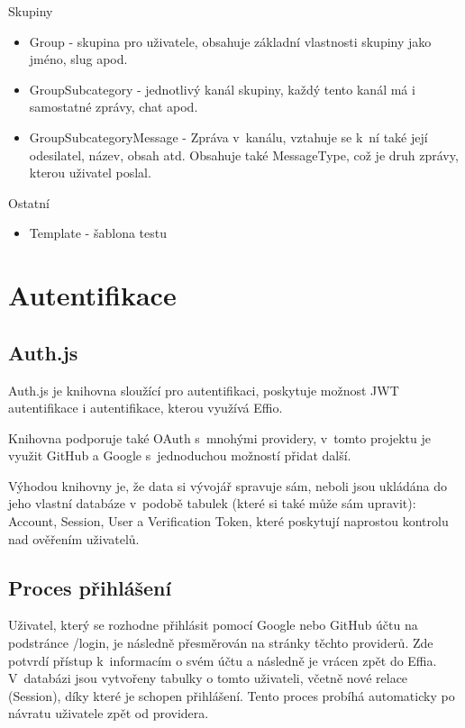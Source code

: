 \documentclass[12pt, a4paper,
openright
]{report}
\begin{document}
Skupiny
\begin{itemize}
	\item Group - skupina pro uživatele, obsahuje základní vlastnosti skupiny jako jméno, slug apod.
	\item GroupSubcategory - jednotlivý kanál skupiny, každý tento kanál má i samostatné zprávy, chat apod.
	\item GroupSubcategoryMessage - Zpráva v~kanálu, vztahuje se k~ní také její odesilatel, název, obsah atd. Obsahuje také MessageType, což je druh zprávy, kterou uživatel poslal.
\end{itemize}
Ostatní
\begin{itemize}
	\item Template - šablona testu
\end{itemize}

\section{Autentifikace}
\subsection{Auth.js}

Auth.js je knihovna sloužící pro autentifikaci, poskytuje možnost JWT autentifikace i   autentifikace, kterou využívá Effio. 

Knihovna podporuje také OAuth s~mnohými providery, v~tomto projektu je využit GitHub a Google s~jednoduchou možností přidat další. 

Výhodou knihovny je, že data si vývojář spravuje sám, neboli jsou ukládána do jeho vlastní databáze v~podobě tabulek (které si také může sám upravit): Account, Session, User a Verification Token, které poskytují naprostou kontrolu nad ověřením uživatelů.

\subsection{Proces přihlášení}
Uživatel, který se rozhodne přihlásit pomocí Google nebo GitHub účtu na podstránce /login, je následně přesměrován na stránky těchto providerů. Zde potvrdí přístup k~informacím o svém účtu a následně je vrácen zpět do Effia. V~databázi jsou vytvořeny tabulky o tomto uživateli, včetně nové relace (Session), díky které je schopen přihlášení. Tento proces probíhá automaticky po návratu uživatele zpět od providera.
\end{document}
